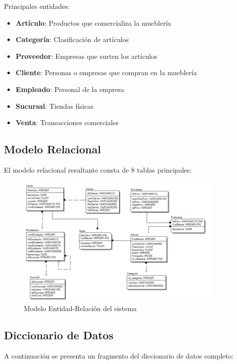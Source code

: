 \documentclass[a4paper, 12pt]{article}
\begin{document}
\vspace{5mm}
Principales entidades:



\begin{itemize}
    \item \textbf{Artículo}: Productos que comercializa la mueblería
    \item \textbf{Categoría}: Clasificación de artículos
    \item \textbf{Proveedor}: Empresas que surten los artículos
    \item \textbf{Cliente}: Personas o empresas que compran en la mueblería
    \item \textbf{Empleado}: Personal de la empresa 
    \item \textbf{Sucursal}: Tiendas físicas
    \item \textbf{Venta}: Transacciones comerciales
\end{itemize}

\subsection{Modelo Relacional}
El modelo relacional resultante consta de 8 tablas principales:

\begin{figure}[H]
\centering
\includegraphics[width=0.9\textwidth]{MR.png}
\caption{Modelo Entidad-Relación del sistema}
\label{fig:mer}
\end{figure}

\subsection{Diccionario de Datos}
A continuación se presenta un fragmento del diccionario de datos completo:
\end{document}
